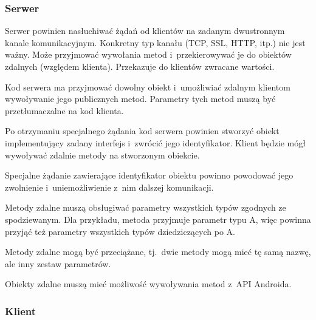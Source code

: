 \subsubsection{Serwer}

\begin{description}

Serwer powinien nasłuchiwać żądań od klientów na zadanym dwustronnym kanale komunikacyjnym.
Konkretny typ kanału (TCP, SSL, HTTP, itp.) nie jest ważny.
Może przyjmować wywołania metod i~przekierowywać je do obiektów zdalnych (względem klienta).
Przekazuje do klientów zwracane wartości.

Kod serwera ma przyjmować dowolny obiekt i~umożliwiać zdalnym klientom wywoływanie jego publicznych metod.
Parametry tych metod muszą być przetłumaczalne na kod klienta.

Po otrzymaniu specjalnego żądania kod serwera powinien stworzyć obiekt implementujący zadany interfejs i~zwrócić jego identyfikator. Klient będzie mógł wywoływać zdalnie metody na stworzonym obiekcie.

Specjalne żądanie zawierające identyfikator obiektu powinno powodować jego zwolnienie i~uniemożliwienie z~nim dalszej komunikacji.

Metody zdalne muszą obsługiwać parametry wszystkich typów zgodnych ze spodziewanym. Dla przykładu, metoda przyjmuje parametr typu A, więc powinna przyjąć też parametry wszystkich typów dziedziczących po A.

Metody zdalne mogą być przeciążane, tj.\ dwie metody mogą mieć tę samą nazwę, ale inny zestaw parametrów.

Obiekty zdalne muszą mieć możliwość wywoływania metod z~API Androida.

\end{description}

\subsubsection{Klient}

